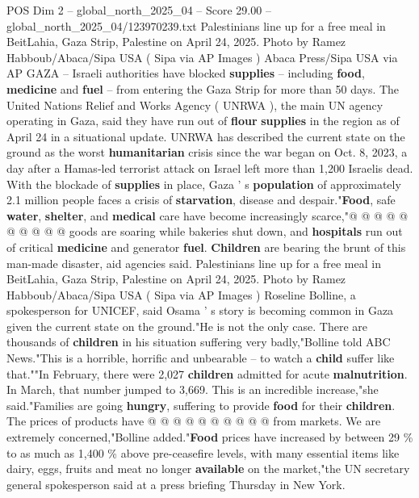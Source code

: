 \begin{textsample}{POS Dim 2 – global\_north\_2025\_04 – Score 29.00 – global\_north\_2025\_04/123970239.txt}  \label{ex:f2_pos_324}
Palestinians line up for a free meal in BeitLahia, Gaza Strip, Palestine on April 24, 2025.
Photo by Ramez Habboub/Abaca/Sipa USA ( Sipa via AP Images ) Abaca Press/Sipa USA via AP GAZA -- Israeli authorities have blocked \textbf{supplies} -- including \textbf{food}, \textbf{medicine} and \textbf{fuel} -- from entering the Gaza Strip for more than 50 days.
The United Nations Relief and Works Agency ( UNRWA ), the main UN agency operating in Gaza, said they have run out of \textbf{flour} \textbf{supplies} in the region as of April 24 in a situational update.
UNRWA has described the current state on the ground as the worst \textbf{humanitarian} crisis since the war began on Oct. 8, 2023, a day after a Hamas-led terrorist attack on Israel left more than 1,200 Israelis dead.
With the blockade of \textbf{supplies} in place, Gaza ' s \textbf{population} of approximately 2.1 million people faces a crisis of \textbf{starvation}, disease and despair."\textbf{Food}, safe \textbf{water}, \textbf{shelter}, and \textbf{medical} care have become increasingly scarce,"@ @ @ @ @ @ @ @ @ @ goods are soaring while bakeries shut down, and \textbf{hospitals} run out of critical \textbf{medicine} and generator \textbf{fuel}. \textbf{Children} are bearing the brunt of this man-made disaster, aid agencies said.
Palestinians line up for a free meal in BeitLahia, Gaza Strip, Palestine on April 24, 2025.
Photo by Ramez Habboub/Abaca/Sipa USA ( Sipa via AP Images ) Roseline Bolline, a spokesperson for UNICEF, said Osama ' s story is becoming common in Gaza given the current state on the ground."He is not the only case.
There are thousands of \textbf{children} in his situation suffering very badly,"Bolline told ABC News."This is a horrible, horrific and unbearable -- to watch a \textbf{child} suffer like that.""In February, there were 2,027 \textbf{children} admitted for acute \textbf{malnutrition}.
In March, that number jumped to 3,669.
This is an incredible increase,"she said."Families are going \textbf{hungry}, suffering to provide \textbf{food} for their \textbf{children}.
The prices of products have @ @ @ @ @ @ @ @ @ @ from markets.
We are extremely concerned,"Bolline added."\textbf{Food} prices have increased by between 29 \% to as much as 1,400 \% above pre-ceasefire levels, with many essential items like dairy, eggs, fruits and meat no longer \textbf{available} on the market,"the UN secretary general spokesperson said at a press briefing Thursday in New York.

\end{textsample}
